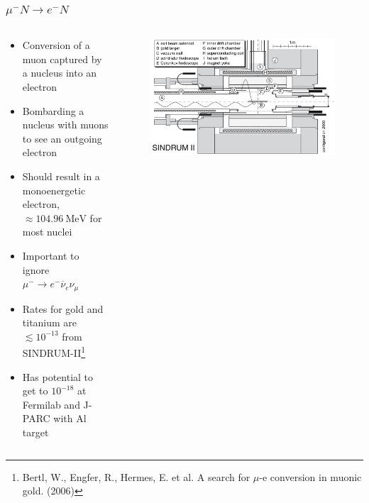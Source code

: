 \documentclass[11pt]{beamer}
\begin{document}
\begin{frame}
    \frametitle{$\mu^- N \rightarrow e^- N$}

    \begin{columns}[c]
        \begin{column}{0.6\textwidth}
            \begin{itemize}
                \item Conversion of a muon captured by a nucleus into an electron
                \item Bombarding a nucleus with muons to see an outgoing electron
                \item Should result in a monoenergetic electron, $\approx\SI{104.96}{\mega\electronvolt}$ for most nuclei
                \item Important to ignore $\mu^-\rightarrow e^- \overline{\nu}_e \nu_\mu$
                \item Rates for gold and titanium are $\lesssim 10^{-13}$ from SINDRUM-II\footnote[frame]{Bertl, W., Engfer, R., Hermes, E. et al. A search for $\mu$-e conversion in muonic gold. (2006)}
                \item Has potential to get to $10^{-18}$ at Fermilab and J-PARC with Al target
            \end{itemize}
        \end{column}
        \begin{column}{0.4\textwidth}
            \begin{figure}[h]
                \begin{center}
                    \includegraphics[width=\textwidth]{SINDRUMII.png}
                \end{center}
            \end{figure}
        \end{column}
    \end{columns}
    

\end{frame}
\end{document}
